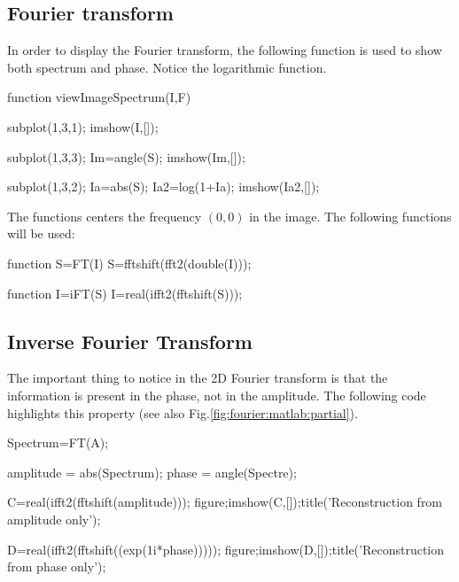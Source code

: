 \def\QRCODE{TB_image_TUT.IMG.cornea_fourier_matlabqrcode.png}
\def\QRPAGE{http://www.iptutorials.science/tree/master/TB_image/TUT.IMG.cornea_fourier/matlab}

\subsection{Fourier transform}

In order to display the Fourier transform, the following function is used to show both spectrum and phase. Notice the logarithmic function.

\begin{matlab}
function viewImageSpectrum(I,F)

subplot(1,3,1);
imshow(I,[]);

subplot(1,3,3);
Im=angle(S);
imshow(Im,[]);

subplot(1,3,2);
Ia=abs(S);
Ia2=log(1+Ia);
imshow(Ia2,[]);
\end{matlab}

The  functions centers the frequency $(0,0)$ in the image. The following functions will be used:
\begin{matlab}
function S=FT(I)
S=fftshift(fft2(double(I)));
\end{matlab}

\begin{matlab}
function I=iFT(S)
I=real(ifft2(fftshift(S)));
\end{matlab}

\subsection{Inverse Fourier Transform}
The important thing to notice in the 2D Fourier transform is that the information is present in the phase, not in the amplitude. The following code highlights this property (see also Fig.\ref{fig:fourier:matlab:partial}).

\begin{matlab}
Spectrum=FT(A);

amplitude = abs(Spectrum);
phase = angle(Spectre);

C=real(ifft2(fftshift(amplitude)));
figure;imshow(C,[]);title('Reconstruction from amplitude only');

D=real(ifft2(fftshift((exp(1i*phase)))));
figure;imshow(D,[]);title('Reconstruction from phase only');
\end{matlab}

